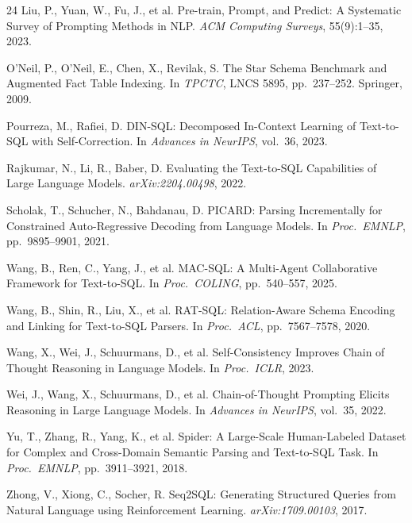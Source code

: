 \documentclass[sigconf, nonacm]{acmart}
\begin{document}
\begin{thebibliography}{24}
 Liu, P., Yuan, W., Fu, J., et al. Pre-train, Prompt, and Predict: A Systematic Survey of Prompting Methods in NLP. \emph{ACM Computing Surveys}, 55(9):1--35, 2023.

 O'Neil, P., O'Neil, E., Chen, X., Revilak, S. The Star Schema Benchmark and Augmented Fact Table Indexing. In \emph{TPCTC}, LNCS 5895, pp.~237--252. Springer, 2009.

 Pourreza, M., Rafiei, D. DIN-SQL: Decomposed In-Context Learning of Text-to-SQL with Self-Correction. In \emph{Advances in NeurIPS}, vol.~36, 2023.

 Rajkumar, N., Li, R., Baber, D. Evaluating the Text-to-SQL Capabilities of Large Language Models. \emph{arXiv:2204.00498}, 2022.

 Scholak, T., Schucher, N., Bahdanau, D. PICARD: Parsing Incrementally for Constrained Auto-Regressive Decoding from Language Models. In \emph{Proc.\ EMNLP}, pp.~9895--9901, 2021.

 Wang, B., Ren, C., Yang, J., et al. MAC-SQL: A Multi-Agent Collaborative Framework for Text-to-SQL. In \emph{Proc.\ COLING}, pp.~540--557, 2025.

 Wang, B., Shin, R., Liu, X., et al. RAT-SQL: Relation-Aware Schema Encoding and Linking for Text-to-SQL Parsers. In \emph{Proc.\ ACL}, pp.~7567--7578, 2020.

 Wang, X., Wei, J., Schuurmans, D., et al. Self-Consistency Improves Chain of Thought Reasoning in Language Models. In \emph{Proc.\ ICLR}, 2023.

 Wei, J., Wang, X., Schuurmans, D., et al. Chain-of-Thought Prompting Elicits Reasoning in Large Language Models. In \emph{Advances in NeurIPS}, vol.~35, 2022.

 Yu, T., Zhang, R., Yang, K., et al. Spider: A Large-Scale Human-Labeled Dataset for Complex and Cross-Domain Semantic Parsing and Text-to-SQL Task. In \emph{Proc.\ EMNLP}, pp.~3911--3921, 2018.

 Zhong, V., Xiong, C., Socher, R. Seq2SQL: Generating Structured Queries from Natural Language using Reinforcement Learning. \emph{arXiv:1709.00103}, 2017.

\end{thebibliography}
\end{document}
